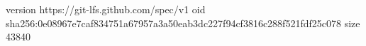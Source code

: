 version https://git-lfs.github.com/spec/v1
oid sha256:0e08967e7caf834751a67957a3a50eab3dc227f94cf3816c288f521fdf25c078
size 43840
